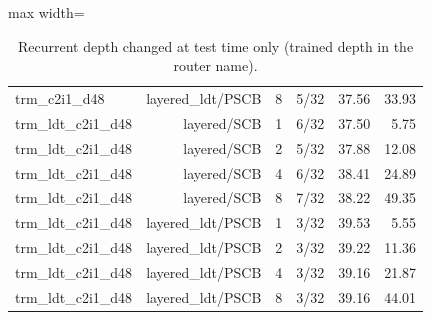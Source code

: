 \begin{table}[t]
\begin{adjustbox}{max width=\linewidth}
\begin{tabular}{lrrrrr}
trm\_c2i1\_d48 & layered\_ldt/PSCB & 8 & 5/32 & 37.56 & 33.93 \\
trm\_ldt\_c2i1\_d48 & layered/SCB & 1 & 6/32 & 37.50 & 5.75 \\
trm\_ldt\_c2i1\_d48 & layered/SCB & 2 & 5/32 & 37.88 & 12.08 \\
trm\_ldt\_c2i1\_d48 & layered/SCB & 4 & 6/32 & 38.41 & 24.89 \\
trm\_ldt\_c2i1\_d48 & layered/SCB & 8 & 7/32 & 38.22 & 49.35 \\
trm\_ldt\_c2i1\_d48 & layered\_ldt/PSCB & 1 & 3/32 & 39.53 & 5.55 \\
trm\_ldt\_c2i1\_d48 & layered\_ldt/PSCB & 2 & 3/32 & 39.22 & 11.36 \\
trm\_ldt\_c2i1\_d48 & layered\_ldt/PSCB & 4 & 3/32 & 39.16 & 21.87 \\
trm\_ldt\_c2i1\_d48 & layered\_ldt/PSCB & 8 & 3/32 & 39.16 & 44.01 \\
\bottomrule
\end{tabular}
\end{adjustbox}
\caption{Recurrent depth changed at test time only (trained depth in the router name).}
\label{tab:mcp02-pilot_cpu-depth}
\end{table}
